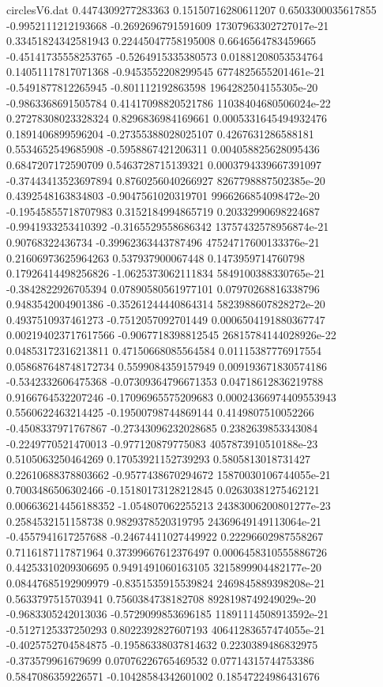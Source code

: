 \begin{filecontents}{circlesV6.dat}
0.4474309277283363	0.15150716280611207	0.6503300035617855
-0.9952111212193668	-0.2692696791591609	17307963302727017e-21
0.33451824342581943	0.22445047758195008	0.6646564783459665
-0.45141735558253765	-0.5264915335380573	0.01881208053534764
0.14051117817071368	-0.9453552208299545	6774825655201461e-21
-0.5491877812265945	-0.801112192863598	1964282504155305e-20
-0.9863368691505784	0.41417098820521786	11038404680506024e-22
0.27278308023328324	0.8296836984169661	0.0005331645494932476
0.1891406899596204	-0.27355388028025107	0.4267631286588181
0.5534652549685908	-0.5958867421206311	0.004058825628095436
0.6847207172590709	0.5463728715139321	0.0003794339667391097
-0.37443413523697894	0.8760256040266927	8267798887502385e-20
0.4392548163834803	-0.9047561020319701	9966266854098472e-20
-0.19545855718707983	0.3152184994865719	0.20332990698224687
-0.9941933253410392	-0.3165529558686342	13757432578956874e-21
0.90768322436734	-0.39962363443787496	47524717600133376e-21
0.21606973625964263	0.537937900067448	0.1473959714760798
0.17926414498256826	-1.0625373062111834	5849100388330765e-21
-0.3842822926705394	0.07890580561977101	0.07970268816338796
0.9483542004901386	-0.35261244440864314	5823988607828272e-20
0.4937510937461273	-0.7512057092701449	0.0006504191880367747
0.002194023717617566	-0.9067718398812545	26815784144028926e-22
0.04853172316213811	0.47150668085564584	0.01115387776917554
0.058687648748172734	0.5599084359157949	0.009193671830574186
-0.5342332606475368	-0.07309364796671353	0.04718612836219788
0.9166764532207246	-0.17096965575209683	0.00024366974409553943
0.5560622463214425	-0.19500798744869144	0.4149807510052266
-0.4508337971767867	-0.27343096232028685	0.2382639853343084
-0.2249770521470013	-0.977120879775083	4057873910510188e-23
0.5105063250464269	0.17053921152739293	0.5805813018731427
0.22610688378803662	-0.9577438670294672	15870030106744055e-21
0.7003486506302466	-0.15180173128212845	0.02630381275462121
0.006636214456188352	-1.054807062255213	24383006200801277e-23
0.2584532151158738	0.9829378520319795	24369649149113064e-21
-0.4557941617257688	-0.24674411027449922	0.22296602987558267
0.7116187117871964	0.37399667612376497	0.0006458310555886726
0.44253310209306695	0.9491491060163105	3215899904482177e-20
0.08447685192909979	-0.8351535915539824	2469845889398208e-21
0.5633797515703941	0.7560384738182708	8928198749249029e-20
-0.9683305242013036	-0.5729099853696185	11891114508913592e-21
-0.5127125337250293	0.8022392827607193	40641283657474055e-21
-0.4025752704584875	-0.19586338037814632	0.2230389486832975
-0.373579961679699	0.07076226765469532	0.07714315744753386
0.5847086359226571	-0.10428584342601002	0.18547224986431676

\end{filecontents}
